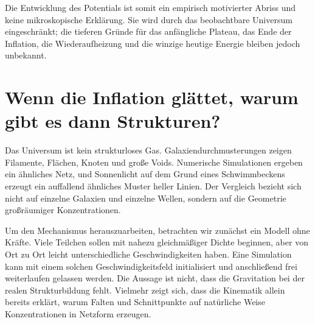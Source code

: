 \begin{classroomqa}
\end{classroomqa}

\begin{classroomqa}
\end{classroomqa}

Die Entwicklung des Potentials ist somit ein empirisch motivierter Abriss und keine mikroskopische Erklärung. Sie wird durch das beobachtbare Universum eingeschränkt; die tieferen Gründe für das anfängliche Plateau, das Ende der Inflation, die Wiederaufheizung und die winzige heutige Energie bleiben jedoch unbekannt.

\section{Wenn die Inflation glättet, warum gibt es dann Strukturen?}

Das Universum ist kein strukturloses Gas. Galaxiendurchmusterungen zeigen Filamente, Flächen, Knoten und große Voids. Numerische Simulationen ergeben ein ähnliches Netz, und Sonnenlicht auf dem Grund eines Schwimmbeckens erzeugt ein auffallend ähnliches Muster heller Linien. Der Vergleich bezieht sich nicht auf einzelne Galaxien und einzelne Wellen, sondern auf die Geometrie großräumiger Konzentrationen.

Um den Mechanismus herauszuarbeiten, betrachten wir zunächst ein Modell ohne Kräfte. Viele Teilchen sollen mit nahezu gleichmäßiger Dichte beginnen, aber von Ort zu Ort leicht unterschiedliche Geschwindigkeiten haben. Eine Simulation kann mit einem solchen Geschwindigkeitsfeld initialisiert und anschließend frei weiterlaufen gelassen werden. Die Aussage ist nicht, dass die Gravitation bei der realen Strukturbildung fehlt. Vielmehr zeigt sich, dass die Kinematik allein bereits erklärt, warum Falten und Schnittpunkte auf natürliche Weise Konzentrationen in Netzform erzeugen.

